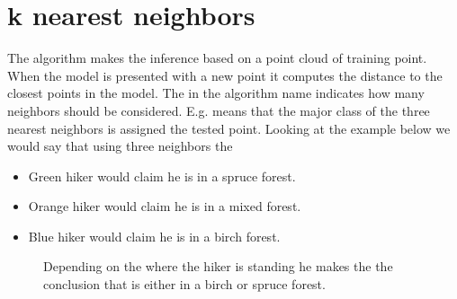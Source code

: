 \documentclass[letterpaper,10pt,english]{sphinxmanual}
\begin{document}
\section{k nearest neighbors}
\label{\detokenize{ML4NeutronImageSegmentation:k-nearest-neighbors}}
The  algorithm makes the inference based on a point cloud of training point. When the model is presented with a new point it computes the distance to the closest points in the model. The  in the algorithm name indicates how many neighbors should be considered. E.g.  means that the major class of the three nearest neighbors is assigned the tested point. Looking at the example below we would say that using three neighbors the
\begin{itemize}
\item {} 
Green hiker would claim he is in a spruce forest.

\item {} 
Orange hiker would claim he is in a mixed forest.

\item {} 
Blue hiker would claim he is in a birch forest.

\end{itemize}

\begin{figure}[htbp]
\centering
\capstart

\noindent{}
\caption{Depending on the where the hiker is standing he makes the the conclusion that is either in a birch or spruce forest.}\label{\detokenize{ML4NeutronImageSegmentation:id17}}\end{figure}
\end{document}
